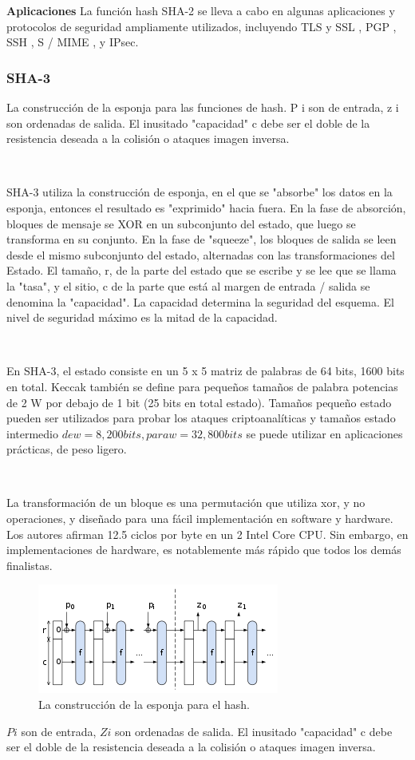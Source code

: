 \documentclass[11pt, conference]{IEEEtran}
\begin{document}
\textbf{Aplicaciones}
La función hash SHA-2 se lleva a cabo en algunas aplicaciones y protocolos de seguridad ampliamente utilizados, incluyendo TLS y SSL , PGP , SSH , S / MIME , y IPsec.


\subsubsection{SHA-3}

La construcción de la esponja para las funciones de hash. P i son de entrada, z i son ordenadas de salida. El inusitado "capacidad" c debe ser el doble de la resistencia deseada a la colisión o ataques imagen inversa.

\

SHA-3 utiliza la construcción de esponja, en el que se "absorbe" los datos en la esponja, entonces el resultado es "exprimido" hacia fuera. En la fase de absorción, bloques de mensaje se XOR en un subconjunto del estado, que luego se transforma en su conjunto. En la fase de "squeeze", los bloques de salida se leen desde el mismo subconjunto del estado, alternadas con las transformaciones del Estado. El tamaño, r, de la parte del estado que se escribe y se lee que se llama la "tasa", y el sitio, c de la parte que está al margen de entrada / salida se denomina la "capacidad". La capacidad determina la seguridad del esquema. El nivel de seguridad máximo es la mitad de la capacidad.

\

En SHA-3, el estado consiste en un 5 x 5 matriz de palabras de 64 bits, 1600 bits en total. Keccak también se define para pequeños tamaños de palabra potencias de 2 W por debajo de 1 bit (25 bits en total estado). Tamaños pequeño estado pueden ser utilizados para probar los ataques criptoanalíticas y tamaños estado intermedio $ de w = 8 , 200 bits, para w = 32 , 800 bits $ se puede utilizar en aplicaciones prácticas, de peso ligero. 

\

La transformación de un bloque es una permutación que utiliza xor, y  no operaciones, y diseñado para una fácil implementación en software y hardware. Los autores afirman 12.5 ciclos por byte en un 2 Intel Core CPU. Sin embargo, en implementaciones de hardware, es notablemente más rápido que todos los demás finalistas. 

\begin{figure}[h]
	\centering
	\includegraphics[scale=0.85]{imagen_4.png} 
	\caption{La construcción de la esponja para el hash.}
\end{figure}
$Pi$ son de entrada, $Zi$ son ordenadas de salida. El inusitado "capacidad" c debe ser el doble de la resistencia deseada a la colisión o ataques imagen inversa.
\end{document}
